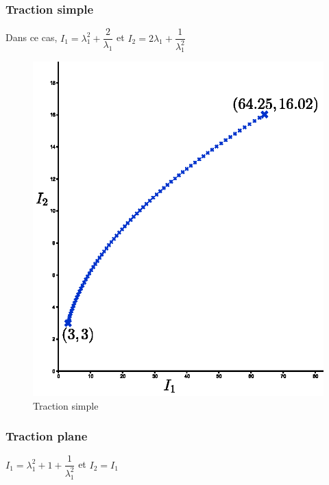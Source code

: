 \documentclass[a4paper,11pt]{article}
\begin{document}
\subsubsection{Traction simple}
Dans ce cas, $I_1=\lambda_1^2+\dfrac{2}{\lambda_1}$ et $I_2=2\lambda_1+\dfrac{1}{\lambda_1^2}$ 
	

\begin{figure}[!ht]
\centering\includegraphics[scale=0.8]{scilab/q2-6-1.eps} 
\caption{Traction simple}
\label{fig:tract_simple}
\end{figure}

\subsubsection{Traction plane}
$I_1=\lambda_1^2+1+\dfrac{1}{\lambda_1^2}$ et $I_2=I_1$ 
	
\end{document}
